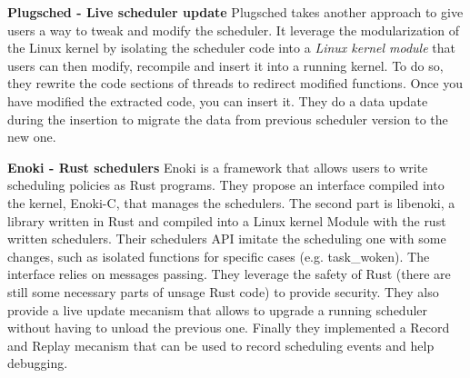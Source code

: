 \par \textbf{Plugsched - Live scheduler update} Plugsched\cite{plugsched} takes another approach to give users a way to tweak and modify the scheduler. It leverage the modularization of the Linux kernel by isolating the scheduler code into a \textit{Linux kernel module} that users can then modify, recompile and insert it into a running kernel. To do so, they rewrite the code sections of threads to redirect modified functions. Once you have modified the extracted code, you can insert it. They do a data update during the insertion to migrate the data from previous scheduler version to the new one.\newline

\par \textbf{Enoki - Rust schedulers} Enoki\cite{enoki} is a framework that allows users to write scheduling policies as Rust programs. They propose an interface compiled into the kernel, Enoki-C, that manages the schedulers. The second part is libenoki, a library written in Rust and compiled into a Linux kernel Module with the rust written schedulers. Their schedulers API imitate the scheduling one with some changes, such as isolated functions for specific cases (e.g. task\_woken). The interface relies on messages passing. They leverage the safety of Rust (there are still some necessary parts of unsage Rust code) to provide security. They also provide a live update mecanism that allows to upgrade a running scheduler without having to unload the previous one. Finally they implemented a Record and Replay mecanism that can be used to record scheduling events and help debugging.\newline


